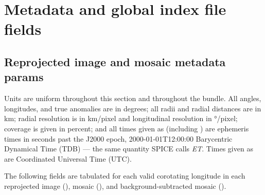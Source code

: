 
\section{Metadata and global index file fields}
\label{sec:metadata-and-global-index-file-fields}


\subsection{Reprojected image and mosaic metadata params}
\label{sec:reprojected-image-and-mosaic-metadata-params}

Units are uniform throughout this section and throughout the bundle. All angles, longitudes, and true anomalies are in degrees; all radii and radial distances are in km; radial resolution is in km/pixel and longitudinal resolution in °/pixel; coverage is given in percent; and all times given as  (including ) are ephemeris times in seconds past the J2000 epoch, 2000-01-01T12:00:00 Barycentric Dynamical Time (TDB) — the same quantity SPICE calls \textit{ET}. Times given as  are Coordinated Universal Time (UTC).

The following fields are tabulated for each valid corotating longitude in each reprojected image (), mosaic (), and background-subtracted mosaic ().

